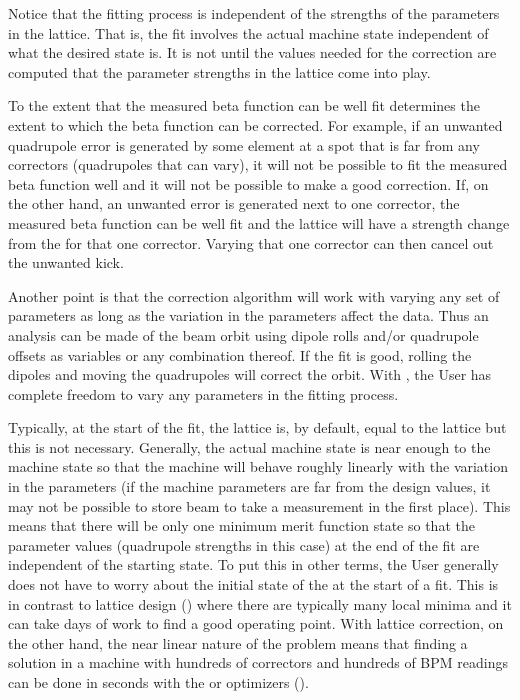 {{{Notice that the fitting process is independent of the strengths of the parameters in the
 lattice. That is, the fit involves the actual machine state independent of what the
desired state is. It is not until the values needed for the correction are computed that the
parameter strengths in the  lattice come into play.

To the extent that the measured beta function can be well fit determines the extent to which the
beta function can be corrected. For example, if an unwanted quadrupole error is generated by some
element at a spot that is far from any correctors (quadrupoles that can vary), it will not be possible to
fit the measured beta function well and it will not be possible to make a good correction. If, on
the other hand, an unwanted error is generated next to one corrector, the measured beta function can
be well fit and the  lattice will have a strength change from the  for that one
corrector. Varying that one corrector can then cancel out the unwanted kick.

Another point is that the correction algorithm will work with varying any set of parameters as long
as the variation in the parameters affect the  data. Thus an analysis can be made of the
beam orbit using dipole rolls and/or quadrupole offsets as variables or any combination thereof. If
the fit is good, rolling the dipoles and moving the quadrupoles will correct the orbit. With \tao,
the User has complete freedom to vary any parameters in the fitting process.

Typically, at the start of the fit, the  lattice is, by default, equal to the 
lattice but this is not necessary. Generally, the actual machine state is near enough to the
 machine state so that the machine will behave roughly linearly with the variation in the
parameters (if the machine parameters are far from the design values, it may not be possible to
store beam to take a measurement in the first place). This means that there will be only one minimum
merit function state so that the parameter values (quadrupole strengths in this case) at the end of
the fit are independent of the starting state. To put this in other terms, the User generally does
not have to worry about the initial state of the  at the start of a fit. This is in
contrast to lattice design () where there are typically many local minima and it
can take days of work to find a good operating point. With lattice correction, on the other hand,
the near linear nature of the problem means that finding a solution in a machine with hundreds of
correctors and hundreds of BPM readings can be done in seconds with the  or 
optimizers ().

}}}
